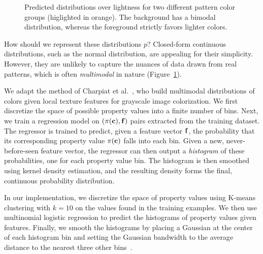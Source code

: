 \begin{figure}[ht]
\caption{Predicted distributions over lightness for two different pattern color groups (higlighted in orange). The background has a bimodal distribution, whereas the foreground strictly favors lighter colors.}
\label{fig:unaryHistograms}
\vspace{-1.0em}
\end{figure}

How should we represent these distributions $p$? Closed-form continuous distributions, such as the normal distribution, are appealing for their simplicity.  However, they are unlikely to capture the nuances of data drawn from real patterns, which is often \emph{multimodal} in nature (Figure~\ref{fig:unaryHistograms}).

We adapt the method of Charpiat et al.~, who build multimodal distributions of colors given local texture features for grayscale image colorization. We first discretize the space of possible property values into a finite number of bins. Next, we train a regression model on $(\pi(\mathbf{c}), \mathbf{f})$ pairs extracted from the training dataset. The regressor is trained to predict, given a feature vector $\mathbf{f}$, the probability that its corresponding property value $\pi(\mathbf{c})$ falls into each bin. Given a new, never-before-seen feature vector, the regressor can then output a \emph{histogram} of these probabilities, one for each property value bin. The histogram is then smoothed using kernel density estimation, and the resulting density forms the final, continuous probability distribution.

In our implementation, we discretize the space of property values using K-means clustering with $k = 10$ on the values found in the training examples. We then use multinomial logistic regression to predict the histograms of property values given features.
Finally, we smooth the histograms by placing a Gaussian at the center of each histogram bin and setting the Gaussian bandwidth to the average distance to the nearest three other bins~\cite{ThemeEnhancement}.



